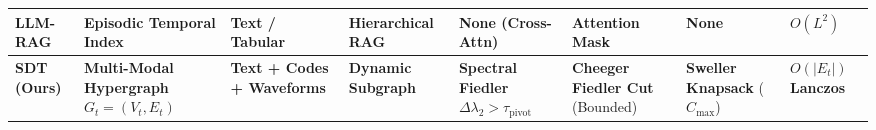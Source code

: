 \documentclass[12pt]{article}
\begin{document}
\begin{table}[h!]
{\begin{tabular}{@{}lp{2.6cm}p{1.8cm}p{1.6cm}p{2.2cm}p{1.8cm}p{1.8cm}p{1.4cm}@{}}
    \textbf{LLM-RAG} \cite{eickhoff2024ehrrag} & Episodic Temporal Index & Text / Tabular & Hierarchical RAG & None (Cross-Attn) & Attention Mask & None & $O(L^2)$ \\
    \midrule
    \textbf{SDT (Ours)} & \textbf{Multi-Modal Hypergraph} $G_t=(V_t,E_t)$ & \textbf{Text + Codes + Waveforms} & \textbf{Dynamic Subgraph} & \textbf{Spectral Fiedler} $\Delta\lambda_2 > \tau_{\text{pivot}}$ & \textbf{Cheeger Fiedler Cut} (Bounded) & \textbf{Sweller Knapsack} ($C_{\max}$) & \textbf{$O(|E_t|)$ Lanczos} \\
    \bottomrule
  \end{tabular}%
  }
\end{table}

\vspace{1cm}

\end{document}
